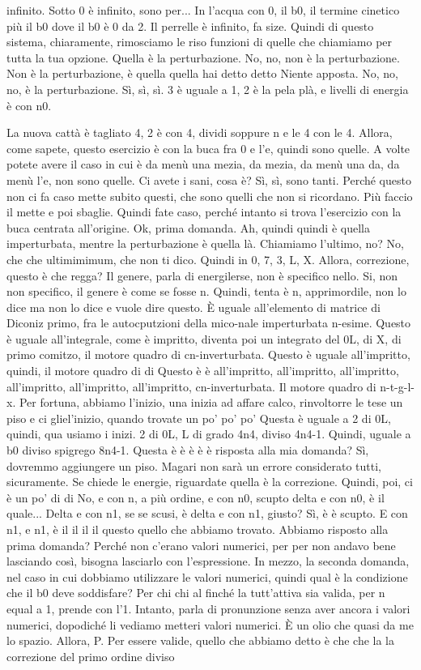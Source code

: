 \begin{soluzione}
{infinito. Sotto 0 è infinito, sono per... In l'acqua con 0, il b0, il termine cinetico più il b0 dove il b0 è 0 da 2. Il perrelle è infinito, fa size. Quindi di questo sistema, chiaramente, rimosciamo le riso funzioni di quelle che chiamiamo per tutta la tua opzione. Quella è la perturbazione. No, no, non è la perturbazione. Non è la perturbazione, è quella quella hai detto detto Niente apposta. No, no, no, è la perturbazione. Sì, sì, sì. 3 è uguale a 1, 2 è la pela plà, e livelli di energia è con n0. 
   
   La nuova cattà è tagliato 4, 2 è con 4, dividi soppure n e le 4 con le 4. Allora, come sapete, questo esercizio è con la buca fra 0 e l'e, quindi sono quelle. A volte potete avere il caso in cui è da menù una mezia, da mezia, da menù una da, da menù l'e, non sono quelle. Ci avete i sani, cosa è? Sì, sì, sono tanti. Perché questo non ci fa caso mette subito questi, che sono quelli che non si ricordano. Più faccio il mette e poi sbaglie. Quindi fate caso, perché intanto si trova l'esercizio con la buca centrata all'origine. Ok, prima domanda. Ah, quindi quindi è quella imperturbata, mentre la perturbazione è quella là. Chiamiamo l'ultimo, no? No, che che ultimimimum, che non ti dico. Quindi in 0, 7, 3, L, X. Allora, correzione, questo è che regga? Il genere, parla di energilerse, non è specifico nello. Si, non non specifico, il genere è come se fosse n. Quindi, tenta è n, apprimordile, non lo dice ma non lo dice e vuole dire questo. È uguale all'elemento di matrice di Diconiz primo, fra le autocputzioni della mico-nale imperturbata n-esime. Questo è uguale all'integrale, come è impritto, diventa poi un integrato del 0L, di X, di primo comitzo, il motore quadro di cn-inverturbata. Questo è uguale all'impritto, quindi, il motore quadro di di Questo è è all'impritto, all'impritto, all'impritto, all'impritto, all'impritto, all'impritto, cn-inverturbata. Il motore quadro di n-t-g-l-x. Per fortuna, abbiamo l'inizio, una inizia ad affare calco, rinvoltorre le tese un piso e ci gliel'inizio, quando trovate un po' po' po' Questa è uguale a 2 di 0L, quindi, qua usiamo i inizi. 2 di 0L, L di grado 4n4, diviso 4n4-1. Quindi, uguale a b0 diviso spigrego 8n4-1. Questa è è è è è risposta alla mia domanda? Sì, dovremmo aggiungere un piso. Magari non sarà un errore considerato tutti, sicuramente. Se chiede le energie, riguardate quella è la correzione. Quindi, poi, ci è un po' di di No, e con n, a più ordine, e con n0, scupto delta e con n0, è il quale... Delta e con n1, se se scusi, è delta e con n1, giusto? Sì, è è scupto. E con n1, e n1, è il il il il questo quello che abbiamo trovato. Abbiamo risposto alla prima domanda? Perché non c'erano valori numerici, per per non andavo bene lasciando così, bisogna lasciarlo con l'espressione. In mezzo, la seconda domanda, nel caso in cui dobbiamo utilizzare le valori numerici, quindi qual è la condizione che il b0 deve soddisfare? Per chi chi al finché la tutt'attiva sia valida, per n equal a 1, prende con l'1. Intanto, parla di pronunzione senza aver ancora i valori numerici, dopodiché li vediamo metteri valori numerici. È un olio che quasi da me lo spazio. Allora, P. Per essere valide, quello che abbiamo detto è che che la la correzione del primo ordine diviso }
\end{soluzione}
